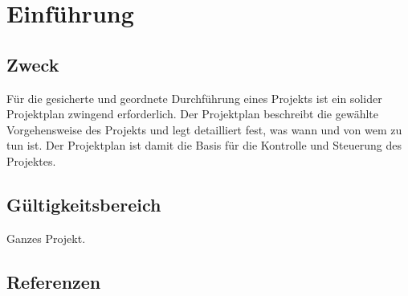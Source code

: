 \chapter{Einführung}
\section{Zweck}
Für die gesicherte und geordnete Durchführung eines Projekts ist ein solider Projektplan zwingend erforderlich. Der Projektplan beschreibt die gewählte Vorgehensweise des Projekts und legt detailliert fest, was wann und von wem zu tun ist. Der Projektplan ist damit die Basis für die Kontrolle und Steuerung des Projektes. 
\section{Gültigkeitsbereich}
Ganzes Projekt.
\section{Referenzen}
